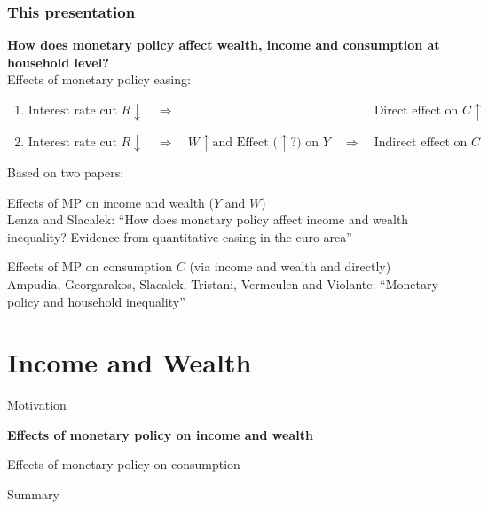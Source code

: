 \documentclass[pdflatex,aspectratio=169]{beamer}
\newcommand{\jemph}[1]{{\color{StataDarkBlue}#1}}
\newcommand{\jbemph}[1]{\textbf{\color{SlideNavy}#1}}
\begin{document}
\begin{frame}
\frametitle{\bf This presentation}

\jbemph{\large How does monetary policy affect wealth, income and consumption \textbf{at household level?}}\\[2mm]
\pause
\jemph{Effects of monetary policy easing:}
\begin{enumerate}\small
\item $\text{Interest rate cut } R\downarrow \quad \Rightarrow \phantom{\quad W\uparrow \text{and Effect (}\uparrow? \text{) on } Y \quad\Rightarrow\quad} \text{Direct effect on } C \uparrow$

\item $
\text{Interest rate cut } R\downarrow \quad \Rightarrow \quad W\uparrow \text{and Effect (}\uparrow? \text{) on } Y \quad\Rightarrow\quad \text{Indirect effect on } C
$
\end{enumerate}
\pause
\vspace*{2.5mm}

\footnotesize
Based on two papers:
\bi\setlength{\itemsep}{4mm}
\item \jemph{Effects of MP on income and wealth ($Y$ and $W$)}\\
Lenza and Slacalek: ``How does monetary policy affect income and wealth inequality? Evidence from quantitative easing in the euro area''
\item \jemph{Effects of MP on consumption $C$ (via income and wealth and directly)}\\
Ampudia, Georgarakos, Slacalek, Tristani, Vermeulen and Violante: ``Monetary policy and household inequality''
\ei

\end{frame}

\section{Income and Wealth}
\begin{frame}
\bi\setlength{\itemsep}{3mm}
\item Motivation
\item \jbemph{Effects of monetary policy on income and wealth}
\item Effects of monetary policy on consumption
\item Summary
\ei
\end{frame}
\end{document}
